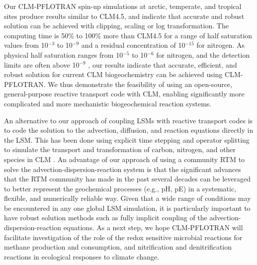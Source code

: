 \documentclass[gmd, manuscript]{copernicus}
\begin{document}
Our CLM-PFLOTRAN spin-up simulations at arctic, temperate, and tropical sites
produce results similar to CLM4.5, and indicate that accurate and robust
solution can be achieved with clipping, scaling or log transformation. The
computing time is 50\% to 100\% more than CLM4.5 for a range of half
saturation values from 10$^{-3}$ to 10$^{-9}$ and a residual concentration of
10$^{-15}$ for nitrogen. As physical half saturation ranges from 10$^{-5}$ to
10$^{-6}$  for nitrogen, and the detection limits are often above
10$^{-9}$ , our results indicate that accurate, efficient, and robust
solution  for current CLM biogeochemistry can be achieved using CLM-PFLOTRAN.
We thus demonstrate the feasibility of using an open-source, general-purpose
reactive transport code with CLM, enabling significantly more complicated and
more mechanistic biogeochemical reaction systems. 
 
An alternative to our approach of coupling LSMs with reactive transport codes
is to code the solution to the advection, diffusion, and reaction equations
directly in the LSM. This has been done using explicit time stepping and
operator splitting to simulate the transport and transformation of carbon,
nitrogen, and other species in CLM \cite{Tang2013b}. An advantage of our
approach of using a community RTM to solve the advection-dispersion-reaction
system is that the significant advances that the RTM community has made in the
past several decades can be leveraged to better represent the geochemical
processes (e.g., pH, pE) in a systematic, flexible, and numerically reliable
way. Given that a wide range of conditions may be encountered in any one global
LSM simulation, it is particularly important to have robust solution methods
such as fully implicit coupling of the advection-dispersion-reaction equations.
As a next step, we hope CLM-PFLOTRAN will facilitate investigation of the role
of the redox sensitive microbial reactions for methane production and
consumption, and nitrification and denitrification reactions in ecological
responses to climate change.  


\end{document}
